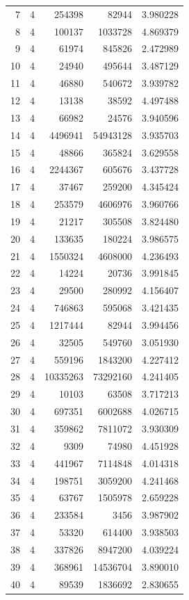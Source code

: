 \begin{longtable}{rrrrr}
7 & 4 & 254398 & 82944 & 3.980228\\
8 & 4 & 100137 & 1033728 & 4.869379\\
9 & 4 & 61974 & 845826 & 2.472989\\
10 & 4 & 24940 & 495644 & 3.487129\\
11 & 4 & 46880 & 540672 & 3.939782\\
12 & 4 & 13138 & 38592 & 4.497488\\
13 & 4 & 66982 & 24576 & 3.940596\\
14 & 4 & 4496941 & 54943128 & 3.935703\\
15 & 4 & 48866 & 365824 & 3.629558\\
16 & 4 & 2244367 & 605676 & 3.437728\\
17 & 4 & 37467 & 259200 & 4.345424\\
18 & 4 & 253579 & 4606976 & 3.960766\\
19 & 4 & 21217 & 305508 & 3.824480\\
20 & 4 & 133635 & 180224 & 3.986575\\
21 & 4 & 1550324 & 4608000 & 4.236493\\
22 & 4 & 14224 & 20736 & 3.991845\\
23 & 4 & 29500 & 280992 & 4.156407\\
24 & 4 & 746863 & 595068 & 3.421435\\
25 & 4 & 1217444 & 82944 & 3.994456\\
26 & 4 & 32505 & 549760 & 3.051930\\
27 & 4 & 559196 & 1843200 & 4.227412\\
28 & 4 & 10335263 & 73292160 & 4.241405\\
29 & 4 & 10103 & 63508 & 3.717213\\
30 & 4 & 697351 & 6002688 & 4.026715\\
31 & 4 & 359862 & 7811072 & 3.930309\\
32 & 4 & 9309 & 74980 & 4.451928\\
33 & 4 & 441967 & 7114848 & 4.014318\\
34 & 4 & 198751 & 3059200 & 4.241468\\
35 & 4 & 63767 & 1505978 & 2.659228\\
36 & 4 & 233584 & 3456 & 3.987902\\
37 & 4 & 53320 & 614400 & 3.938503\\
38 & 4 & 337826 & 8947200 & 4.039224\\
39 & 4 & 368961 & 14536704 & 3.890010\\
40 & 4 & 89539 & 1836692 & 2.830655\\

\end{longtable}
